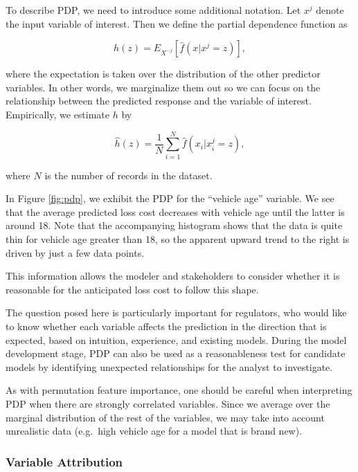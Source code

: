 \documentclass[preprint, 3p, twocolumn, letterpaper, 10pt]{elsarticle} %
\begin{document}
To describe PDP, we need to introduce some additional notation. Let \(x^j\) denote
the input variable of interest. Then we define the partial dependence function as

\begin{equation}
h(z) = E_{X^{-j}}[\widehat{f}(x|x^j = z)],
\end{equation}

where the expectation is taken over the distribution of the other predictor
variables. In other words, we marginalize them out so we can focus on the
relationship between the predicted response and the variable of interest.
Empirically, we estimate \(h\) by

\begin{equation}
\widehat{h}(z) = \frac{1}{N}\sum_{i = 1}^{N}\widehat{f}(x_i|x_i^{j} = z),
\end{equation}

where \(N\) is the number of records in the dataset.

In Figure \ref{fig:pdp}, we exhibit the PDP for the ``vehicle age'' variable.
We see that the average predicted loss cost decreases with vehicle age until
the latter is around 18. Note that the accompanying histogram shows that the
data is quite thin for vehicle age greater than 18, so the apparent upward
trend to the right is driven by just a few data points.

This information allows the modeler and stakeholders to consider whether it
is reasonable for the anticipated loss cost to follow this shape.

The question posed here is particularly important for regulators, who would
like to know whether each variable affects the prediction in the direction that
is expected, based on intuition, experience, and existing models. During the
model development stage, PDP can also be used as a reasonableness test for
candidate models by identifying unexpected relationships for the analyst to
investigate.

As with permutation feature importance, one should be careful when interpreting
PDP when there are strongly correlated variables. Since we average over the
marginal distribution of the rest of the variables, we may take into account
unrealistic data (e.g.~high vehicle age for a model that is brand new).

\hypertarget{variable-attribution}{%
\subsubsection{Variable Attribution}\label{variable-attribution}}
\end{document}
